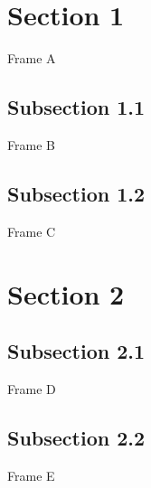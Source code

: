 \documentclass[nooutline]{beamer}
\begin{document}
\section{Section 1}

\begin{frame}{Frame A}  
\end{frame}

\subsection{Subsection 1.1}

\begin{frame}{Frame B}  
\end{frame}

\subsection{Subsection 1.2}

\begin{frame}{Frame C}  
\end{frame}


\section{Section 2}

\subsection{Subsection 2.1}

\begin{frame}{Frame D}  
\end{frame}

\subsection{Subsection 2.2}

\begin{frame}{Frame E}  
\end{frame}
\end{document}
